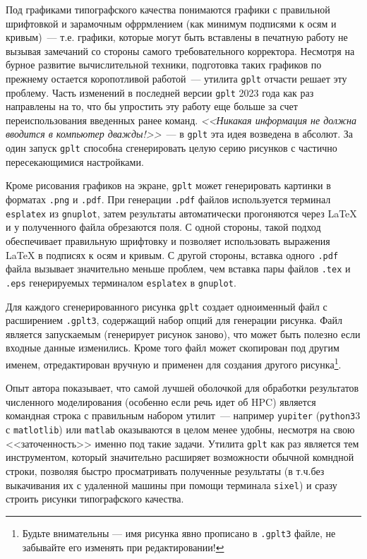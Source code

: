 \documentclass[12pt]{article}
\def\gplt{{\tt gplt}}
\def\gnuplot{{\tt gnuplot}}
\def\python{{\tt python3}}
\def\png{{\tt .png}}
\def\pdf{{\tt .pdf}}
\begin{document}
Под графиками типографского качества понимаются графики с правильной шрифтовкой и зарамочным офррмлением (как минимум подписями к осям и кривым)~---
т.е. графики, которые могут быть  вставлены в печатную
работу не вызывая замечаний со стороны самого требовательного корректора. Несмотря на бурное развитие вычислительной техники, подготовка таких графиков по прежнему
остается коропотливой работой~--- утилита \gplt{} отчасти решает эту проблему.
Часть изменений в последней версии \gplt{} 2023 года как раз направлены на то, что бы упростить эту работу
еще больше за счет переиспользования введенных ранее команд. {\it<<Никакая информация не должна вводится в компьютер дважды!>>}~--- в \gplt{} эта идея возведена в абсолют.
За один запуск \gplt{} способна сгенерировать целую серию рисунков с частично пересекающимися настройками.

Кроме рисования графиков на экране, \gplt{} может генерировать картинки в форматах \png{} и \pdf.  При генерации \pdf{}  файлов используется терминал {\tt esplatex}
из \gnuplot, затем результаты автоматически прогоняются через \LaTeX{} и у полученного файла обрезаются поля. С одной стороны, такой подход  обеспечивает правильную
шрифтовку и позволяет использовать выражения \LaTeX{} в подписях к осям и кривым. С другой стороны, вставка одного \pdf{} файла вызывает
значительно меньше проблем, чем вставка пары файлов \verb'.tex' и \verb'.eps' генерируемых терминалом {\tt esplatex} в \gnuplot.

Для каждого сгенерированного рисунка \gplt{} создает одноименный  файл с расширением \verb'.gplt3', содержащий набор опций для генерации рисунка.
Файл является запускаемым (генерирует рисунок заново), что может быть полезно если входные данные изменились.
Кроме того файл может скопирован под другим именем, отредактирован вручную и применен для создания другого рисунка\footnote{Будьте внимательны ---
  имя рисунка явно прописано в {\tt .gplt3} файле, не забывайте его изменять при редактировании!}.

Опыт автора показывает, что самой лучшей оболочкой для обработки результатов численного моделирования (особенно если речь идет об HPC) является командная строка
с правильным набором утилит~--- например \verb'yupiter' (\python3 с \verb'matlotlib') или \verb'matlab' оказываются в целом менее удобны, несмотря на свою <<заточенность>>
именно под такие задачи. Утилита   \gplt{} как раз является тем инструментом, который значительно расширяет возможности обычной комндной строки,
позволяя быстро просматривать полученные результаты (в т.ч.без выкачивания их с удаленной машины при помощи терминала \verb'sixel')
и сразу строить рисунки типографского качества. 
\end{document}
